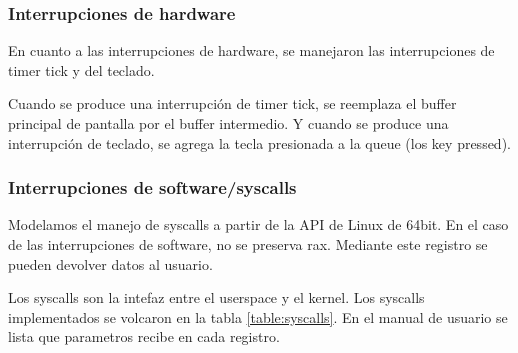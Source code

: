 \documentclass{article}
\begin{document}
\subsubsection {Interrupciones de hardware}

En cuanto a las interrupciones de hardware, se manejaron las interrupciones de timer tick y del teclado.

Cuando se produce una interrupción de timer tick, se reemplaza el buffer principal de pantalla por el buffer intermedio. Y cuando se produce una interrupción de teclado, se agrega la tecla presionada a la queue (los key pressed).

\subsubsection {Interrupciones de software/syscalls}

Modelamos el manejo de syscalls a partir de la API de Linux de 64bit. En el caso de las interrupciones de software, no se preserva rax. Mediante este registro se pueden devolver datos al usuario.

Los syscalls son la intefaz entre el userspace y el kernel. Los syscalls implementados se volcaron en la tabla \ref{table:syscalls}. En el manual de usuario se lista que parametros recibe en cada registro.
\end{document}
